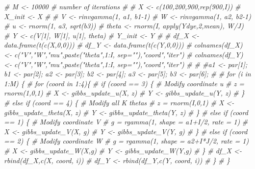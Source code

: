 \documentclass[
]{article}
\newenvironment{Shaded}{\begin{snugshade}}{\end{snugshade}}
\newcommand{\CommentTok}[1]{\textcolor[rgb]{0.56,0.35,0.01}{\textit{#1}}}
\begin{document}
\begin{Shaded}
\begin{Highlighting}[]
\CommentTok{\# M \textless{}{-} 10000 \# number of iterations }
\CommentTok{\# }
\CommentTok{\# X \textless{}{-} c(100,200,900,rep(900,I))}
\CommentTok{\# X\_init \textless{}{-} X}
\CommentTok{\# }
\CommentTok{\# V \textless{}{-} rinvgamma(1, a1, b1{-}1)}
\CommentTok{\# W \textless{}{-} rinvgamma(1, a2, b2{-}1)}
\CommentTok{\# u \textless{}{-} rnorm(1, a3, sqrt(b3))}
\CommentTok{\# theta \textless{}{-} rnorm(I, apply(Ydye,2,mean), W/J)}
\CommentTok{\# Y \textless{}{-} c(V[1], W[1], u[1], theta)}
\CommentTok{\# Y\_init \textless{}{-} Y}
\CommentTok{\# }
\CommentTok{\# df\_X \textless{}{-} data.frame(t(c(X,0,0)))}
\CommentTok{\# df\_Y \textless{}{-} data.frame(t(c(Y,0,0)))}
\CommentTok{\# colnames(df\_X) \textless{}{-} c("V","W","mu",paste("theta",1:I, sep=""),"coord","iter")}
\CommentTok{\# colnames(df\_Y) \textless{}{-} c("V","W","mu",paste("theta",1:I, sep=""),"coord","iter")}
\CommentTok{\# }
\CommentTok{\# \#a1 \textless{}{-} par[1]; b1 \textless{}{-} par[2]; a2 \textless{}{-} par[3]; b2 \textless{}{-} par[4]; a3 \textless{}{-} par[5]; b3 \textless{}{-} par[6];}
\CommentTok{\#   }
\CommentTok{\# for (i in 1:M) \{}
\CommentTok{\#     for (coord in 1:4)\{}
\CommentTok{\#       if (coord == 3) \{ \# Modify coordinate u}
\CommentTok{\#         z = rnorm(1,0,1)}
\CommentTok{\#         X \textless{}{-} gibbs\_update\_u(X, z)}
\CommentTok{\#         Y \textless{}{-} gibbs\_update\_u(Y, z)}
\CommentTok{\#       \}}
\CommentTok{\#       else if (coord == 4) \{ \# Modify all K thetas}
\CommentTok{\#         z = rnorm(I,0,1)}
\CommentTok{\#         X \textless{}{-} gibbs\_update\_theta(X, z)}
\CommentTok{\#         Y \textless{}{-} gibbs\_update\_theta(Y, z)}
\CommentTok{\#       \}}
\CommentTok{\#       else if (coord == 1) \{ \# Modify coordinate V}
\CommentTok{\#         g = rgamma(1, shape = a1+I/2, rate = 1)}
\CommentTok{\#         X \textless{}{-} gibbs\_update\_V(X, g)}
\CommentTok{\#         Y \textless{}{-} gibbs\_update\_V(Y, g)}
\CommentTok{\#       \}}
\CommentTok{\#       else if (coord == 2) \{ \# Modify coordinate W}
\CommentTok{\#         g = rgamma(1, shape = a2+I*J/2, rate = 1)}
\CommentTok{\#         X \textless{}{-} gibbs\_update\_W(X,g)}
\CommentTok{\#         Y \textless{}{-} gibbs\_update\_W(Y,g)}
\CommentTok{\#       \}}
\CommentTok{\#       df\_X \textless{}{-} rbind(df\_X,c(X, coord, i))}
\CommentTok{\#       df\_Y \textless{}{-} rbind(df\_Y,c(Y, coord, i))}
\CommentTok{\#     \}}
\CommentTok{\# \}}
\end{Highlighting}
\end{Shaded}
\end{document}
